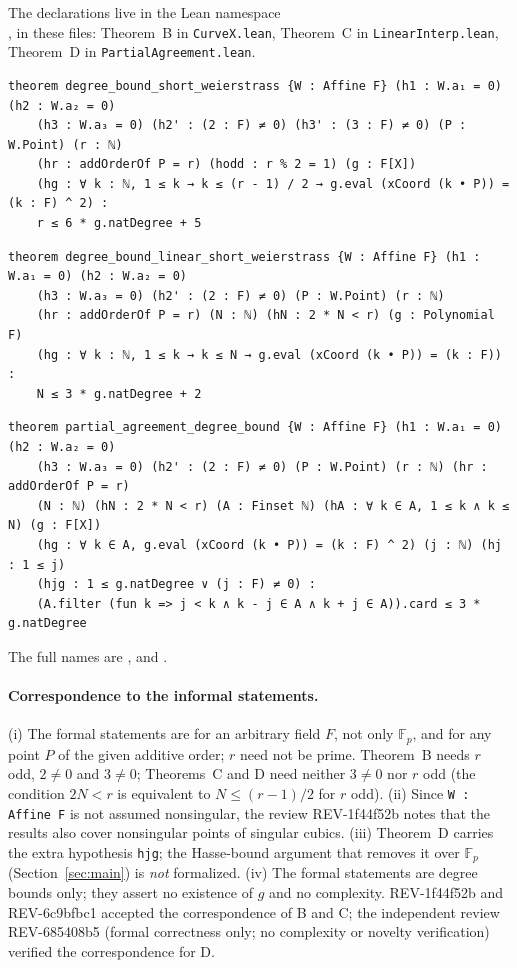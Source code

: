 \documentclass[11pt,a4paper]{article}
\theoremstyle{remark}
\newcommand{\F}{\mathbb{F}}
\begin{document}
The declarations live in the Lean namespace\\ , in these files: Theorem~B in \texttt{CurveX.lean}, Theorem~C in \texttt{LinearInterp.lean}, Theorem~D in \texttt{PartialAgreement.lean}.
\begin{lstlisting}
theorem degree_bound_short_weierstrass {W : Affine F} (h1 : W.a₁ = 0) (h2 : W.a₂ = 0)
    (h3 : W.a₃ = 0) (h2' : (2 : F) ≠ 0) (h3' : (3 : F) ≠ 0) (P : W.Point) (r : ℕ)
    (hr : addOrderOf P = r) (hodd : r % 2 = 1) (g : F[X])
    (hg : ∀ k : ℕ, 1 ≤ k → k ≤ (r - 1) / 2 → g.eval (xCoord (k • P)) = (k : F) ^ 2) :
    r ≤ 6 * g.natDegree + 5
\end{lstlisting}
\begin{lstlisting}
theorem degree_bound_linear_short_weierstrass {W : Affine F} (h1 : W.a₁ = 0) (h2 : W.a₂ = 0)
    (h3 : W.a₃ = 0) (h2' : (2 : F) ≠ 0) (P : W.Point) (r : ℕ)
    (hr : addOrderOf P = r) (N : ℕ) (hN : 2 * N < r) (g : Polynomial F)
    (hg : ∀ k : ℕ, 1 ≤ k → k ≤ N → g.eval (xCoord (k • P)) = (k : F)) :
    N ≤ 3 * g.natDegree + 2
\end{lstlisting}
\begin{lstlisting}
theorem partial_agreement_degree_bound {W : Affine F} (h1 : W.a₁ = 0) (h2 : W.a₂ = 0)
    (h3 : W.a₃ = 0) (h2' : (2 : F) ≠ 0) (P : W.Point) (r : ℕ) (hr : addOrderOf P = r)
    (N : ℕ) (hN : 2 * N < r) (A : Finset ℕ) (hA : ∀ k ∈ A, 1 ≤ k ∧ k ≤ N) (g : F[X])
    (hg : ∀ k ∈ A, g.eval (xCoord (k • P)) = (k : F) ^ 2) (j : ℕ) (hj : 1 ≤ j)
    (hjg : 1 ≤ g.natDegree ∨ (j : F) ≠ 0) :
    (A.filter (fun k => j < k ∧ k - j ∈ A ∧ k + j ∈ A)).card ≤ 3 * g.natDegree
\end{lstlisting}
The full names are ,  and .

\paragraph{Correspondence to the informal statements.}
(i) The formal statements are for an arbitrary field $F$, not only $\F_p$, and for any point $P$ of the given additive order; $r$ need not be prime. Theorem~B needs $r$ odd, $2\ne0$ and $3\ne0$;
Theorems~C and D need neither $3\ne0$ nor $r$ odd (the condition $2N<r$ is equivalent to $N\le(r-1)/2$ for $r$ odd). (ii) Since \texttt{W : Affine F} is not assumed nonsingular, the review \mbox{REV-1f44f52b} notes
that the results also cover nonsingular points of singular cubics. (iii) Theorem~D carries the extra hypothesis \texttt{hjg}; the Hasse-bound argument that removes it over $\F_p$ (Section~\ref{sec:main}) is \emph{not} formalized.
(iv) The formal statements are degree bounds only; they assert no existence of $g$ and no complexity. \mbox{REV-1f44f52b} and \mbox{REV-6c9bfbc1} accepted the correspondence of B and C; the independent review \mbox{REV-685408b5} (formal correctness only; no complexity or novelty verification) verified the correspondence for D.
\end{document}

